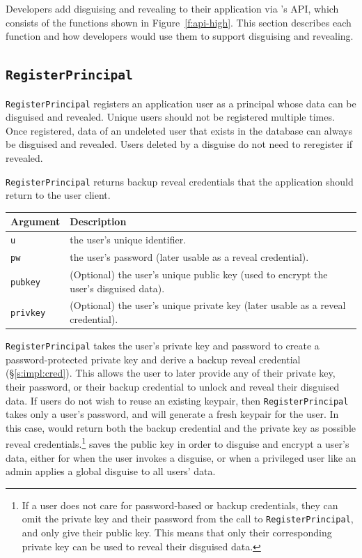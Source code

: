 Developers add disguising and revealing to their application via \sys's API,
which consists of the functions shown in Figure~\ref{f:api-high}. This section
describes each function and how developers would use them to support disguising
and revealing.

\subsection{\texttt{RegisterPrincipal}}
    \texttt{RegisterPrincipal} registers an application user as a principal
    whose data can be disguised and revealed. Unique users should not be
    registered multiple times. Once registered, data of an undeleted user that
    exists in the database can always be disguised and revealed.  Users deleted
    by a disguise do not need to reregister if revealed.

    \texttt{RegisterPrincipal} returns backup reveal credentials that the
    application should return to the user client.

    \begin{center}
    \begin{longtable}{|m{}|m{}|}
        \hline
        \textbf{Argument} & \textbf{Description} \\
        \hline
        \texttt{u} & the user's unique identifier.\\
        \hline
        \texttt{pw} & the user's password (later usable as a reveal credential).\\
        \hline
        \texttt{pubkey} & (Optional) the user's unique public key (used to encrypt the
        user's disguised data).\\
        \hline
        \texttt{privkey} & (Optional) the user's unique private key (later usable as a reveal
        credential).\\
        \hline
    \end{longtable}
    \end{center}
    \vspace{-24pt}

    \texttt{RegisterPrincipal} takes the user's private key and password to
    create a password-protected private key and derive a backup reveal
    credential (\S\ref{s:impl:cred}).  This allows the user to later provide any
    of their private key, their password, or their backup credential to unlock
    and reveal their disguised data. 
    If users do not wish to reuse an existing keypair, then
    \texttt{RegisterPrincipal} takes only a user's password, and \sys will
    generate a fresh keypair for the user. In this case, \sys would return both
    the backup credential and the private key as possible reveal
    credentials.\footnote{If a user does not care for password-based or backup
    credentials, they can omit the private key and their password from the call
    to \texttt{RegisterPrincipal}, and only give \sys their public key. This
    means that only their corresponding private key can be used to reveal their
    disguised data.}
%
    \sys saves the public key in order to disguise and encrypt a user's
    data, either for when the user invokes a disguise, or when a privileged user
    like an admin applies a global disguise to all users' data.
    
